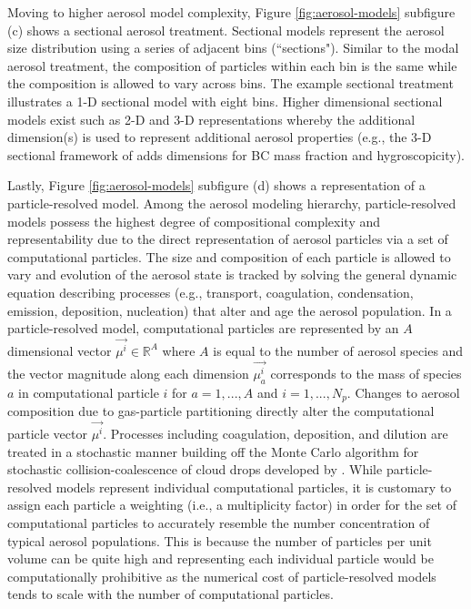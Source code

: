 Moving to higher aerosol model complexity, Figure \ref{fig:aerosol-models} subfigure (c) shows a sectional aerosol treatment. Sectional models represent the aerosol size distribution using a series of adjacent bins (``sections"). Similar to the modal aerosol treatment, the composition of particles within each bin is the same while the composition is allowed to vary across bins. The example sectional treatment illustrates a 1-D sectional model with eight bins. Higher dimensional sectional models exist such as 2-D and 3-D representations whereby the additional dimension(s) is used to represent additional aerosol properties (e.g., the 3-D sectional framework of \textcite{ching_three-dimensional_2016} adds dimensions for BC mass fraction and hygroscopicity).

Lastly, Figure \ref{fig:aerosol-models} subfigure (d) shows a representation of a particle-resolved model. Among the aerosol modeling hierarchy, particle-resolved models possess the highest degree of compositional complexity and representability due to the direct representation of aerosol particles via a set of computational particles. The size and composition of each particle is allowed to vary and evolution of the aerosol state is tracked by solving the general dynamic equation describing processes (e.g., transport, coagulation, condensation, emission, deposition, nucleation) that alter and age the aerosol population. In a particle-resolved model, computational particles are represented by an $A$ dimensional vector $\vec{\mu^i}\in \mathbb{R}^A$ where $A$ is equal to the number of aerosol species and the vector magnitude along each dimension $\vec{\mu_a^i}$ corresponds to the mass of species $a$ in computational particle $i$ for $a=1,...,A$ and $i=1,...,N_p$. Changes to aerosol composition due to gas-particle partitioning directly alter the computational particle vector $\vec{\mu^i}$. Processes including coagulation, deposition, and dilution are treated in a stochastic manner building off the Monte Carlo algorithm for stochastic collision-coalescence of cloud drops developed by \textcite{gillespie_exact_1975}. While particle-resolved models represent individual computational particles, it is customary to assign each particle a weighting (i.e., a multiplicity factor) in order for the set of computational particles to accurately resemble the number concentration of typical aerosol populations. This is because the number of particles per unit volume can be quite high and representing each individual particle would be computationally prohibitive as the numerical cost of particle-resolved models tends to scale with the number of computational particles. 

